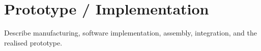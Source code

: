 \section{Prototype / Implementation}
Describe manufacturing, software implementation, 
assembly, integration, and the realised prototype.